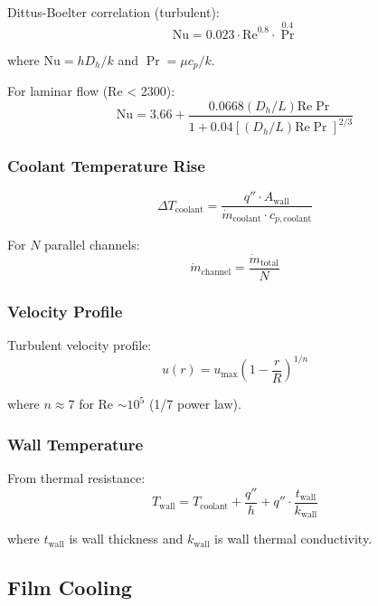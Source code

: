\documentclass[12pt,a4paper]{article}
\newcommand{\mdot}{\dot{m}}
\begin{document}
Dittus-Boelter correlation (turbulent):
\begin{equation}
\text{Nu} = 0.023 \cdot \text{Re}^{0.8} \cdot \Pr^{0.4}
\end{equation}

where $\text{Nu} = h D_h / k$ and $\Pr = \mu c_p / k$.

For laminar flow (Re < 2300):
\begin{equation}
\text{Nu} = 3.66 + \frac{0.0668 (D_h/L) \text{Re} \Pr}{1 + 0.04 [(D_h/L) \text{Re} \Pr]^{2/3}}
\end{equation}

\subsubsection{Coolant Temperature Rise}

\begin{equation}
\Delta T_{\text{coolant}} = \frac{q'' \cdot A_{\text{wall}}}{\mdot_{\text{coolant}} \cdot c_{p,\text{coolant}}}
\end{equation}

For $N$ parallel channels:
\begin{equation}
\mdot_{\text{channel}} = \frac{\mdot_{\text{total}}}{N}
\end{equation}

\subsubsection{Velocity Profile}

Turbulent velocity profile:
\begin{equation}
u(r) = u_{\max} \left(1 - \frac{r}{R}\right)^{1/n}
\end{equation}

where $n \approx 7$ for Re $\sim 10^5$ (1/7 power law).

\subsubsection{Wall Temperature}

From thermal resistance:
\begin{equation}
T_{\text{wall}} = T_{\text{coolant}} + \frac{q''}{h} + q'' \cdot \frac{t_{\text{wall}}}{k_{\text{wall}}}
\end{equation}

where $t_{\text{wall}}$ is wall thickness and $k_{\text{wall}}$ is wall thermal conductivity.

\subsection{Film Cooling}
\end{document}
